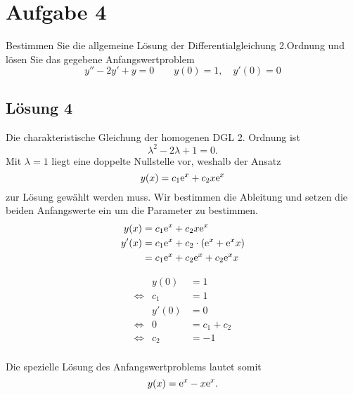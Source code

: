 \documentclass[main.tex]{subfiles}
\begin{document}
\section{Aufgabe 4}
Bestimmen Sie die allgemeine Lösung der Differentialgleichung 2.Ordnung und lösen Sie das gegebene Anfangswertproblem
\begin{equation*}
    y'' - 2y' + y = 0 \qquad y(0)=1, \quad y'(0)=0
\end{equation*}

\subsection{Lösung 4}
Die charakteristische Gleichung der homogenen DGL 2. Ordnung ist 
$$
    \lambda^2 - 2\lambda + 1 = 0.
$$
Mit $\lambda = 1$ liegt eine doppelte Nullstelle vor, weshalb der Ansatz
$$
    y(x) = c_1 \mathrm{e}^{x} + c_2 x \mathrm{e}^{x}
$$
zur Lösung gewählt werden muss.
Wir bestimmen die Ableitung und setzen die beiden Anfangswerte ein um die Parameter zu bestimmen.
\begin{align*}
    y(x)  &= c_1 \mathrm{e}^{x} + c_2 x \mathrm{e}^{x} \\
    y'(x) &= c_1 \mathrm{e}^{x} + c_2 \cdot \left( \mathrm{e}^{x} + \mathrm{e}^{x}x \right) \\
          &= c_1 \mathrm{e}^{x} + c_2\mathrm{e}^{x} + c_2\mathrm{e}^{x}x
\end{align*}

\begin{equation*}
\begin{array}{rrl}
                & y(0) & = 1 \\
\Leftrightarrow & c_1  &= 1 \\[2mm]
                & y'(0) &= 0 \\
\Leftrightarrow & 0 &= c_1 + c_2 \\
\Leftrightarrow & c_2 &= -1 \\
\end{array}
\end{equation*}

Die spezielle Lösung des Anfangswertproblems lautet somit
$$
    y(x) = \mathrm{e}^{x} - x \mathrm{e}^{x}.
$$
\end{document}
